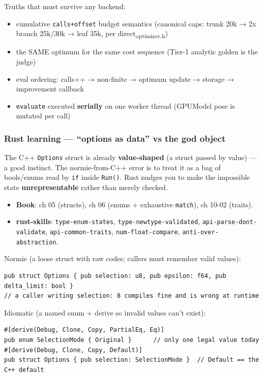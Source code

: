 \documentclass[11pt]{article}
\begin{document}
Truths that must survive any backend:

\begin{itemize}
\item cumulative \texttt{calls+offset} budget semantics (canonical caps: trunk 20k → 2x branch 25k/30k → leaf 35k, per direct\textsubscript{optimizer.h})
\item the SAME optimum for the same cost sequence (Tier-1 analytic golden is the judge)
\item eval ordering: calls++ → non-finite → optimum update → storage → improvement callback
\item \texttt{evaluate} executed \textbf{\textbf{serially}} on one worker thread (GPUModel pose is mutated per call)
\end{itemize}
\subsubsection{Rust learning — ``options as data'' vs the god object}
\label{sec:org18e2fee}

The C++ \texttt{Options} struct is already \textbf{value-shaped} (a struct passed by value)
— a good instinct. The normie-from-C++ error is to treat it as a bag of
bools/enums read by \texttt{if} inside \texttt{Run()}. Rust nudges you to make the impossible
state \textbf{unrepresentable} rather than merely checked.

\begin{itemize}
\item \textbf{\textbf{Book}}: ch 05 (structs), ch 06 (enums + exhaustive \texttt{match}),
ch 10-02 (traits).
\item \textbf{\textbf{rust-skills}}: \texttt{type-enum-states}, \texttt{type-newtype-validated},
\texttt{api-parse-dont-validate}, \texttt{api-common-traits}, \texttt{num-float-compare},
\texttt{anti-over-abstraction}.
\end{itemize}

Normie (a loose struct with raw codes; callers must remember valid values):

\begin{verbatim}
pub struct Options { pub selection: u8, pub epsilon: f64, pub delta_limit: bool }
// a caller writing selection: 8 compiles fine and is wrong at runtime
\end{verbatim}

Idiomatic (a named enum + derive so invalid values can't exist):

\begin{verbatim}
#[derive(Debug, Clone, Copy, PartialEq, Eq)]
pub enum SelectionMode { Original }      // only one legal value today
#[derive(Debug, Clone, Copy, Default)]
pub struct Options { pub selection: SelectionMode }  // Default == the C++ default
\end{verbatim}
\end{document}
